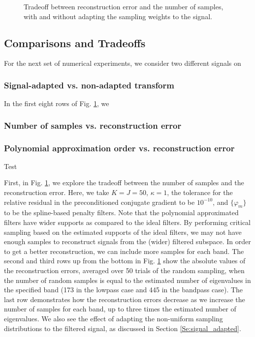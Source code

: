 \documentclass[journal, 10pt]{IEEEtran}
\begin{document}
{\begin{figure}[H]
\begin{minipage}[m]{0.4\linewidth}
\end{minipage}
\caption{Tradeoff between reconstruction error and the number of samples, with and without adapting the sampling weights to the signal.}\label{Fig:samp_tradeoff}
\end{figure}

\subsection{Comparisons and Tradeoffs}

For the next set of numerical experiments, we consider two different signals on 

\subsubsection{Signal-adapted vs. non-adapted transform}

In the first eight rows of Fig. \ref{Fig:samp_tradeoff}, we 

\subsubsection{Number of samples vs. reconstruction error}


\subsubsection{Polynomial approximation order vs. reconstruction error}

Test

}

First, in Fig. \ref{Fig:samp_tradeoff}, we explore the tradeoff between the number of samples and the reconstruction error.  Here, we take $K=J=50$, $\kappa=1$, the tolerance for the relative residual in the preconditioned conjugate gradient to be $10^{-10}$, and $\{\varphi_m\}$ to be the spline-based penalty filters.  Note that the polynomial approximated filters have wider supports as compared to the ideal filters. By performing critical sampling based on the estimated supports of the ideal filters, we may not have enough samples to reconstruct signals from the (wider) filtered subspace. %
In order to get a better reconstruction, we can include more samples for each band. The second and third rows up from the bottom in Fig. \ref{Fig:samp_tradeoff} show the absolute values of the reconstruction errors, averaged over 50 trials of the random sampling, when the number of random samples is equal to the estimated number of eigenvalues in the specified band (173 in the lowpass case and 445 in the bandpass case). The last row demonstrates how the 
reconstruction errors %
decrease as we increase the number of samples for each band, up to three times the estimated number of eigenvalues. We also see the effect of adapting the non-uniform sampling distributions to the filtered signal, as discussed in Section \ref{Se:signal_adapted}. %
\end{document}
